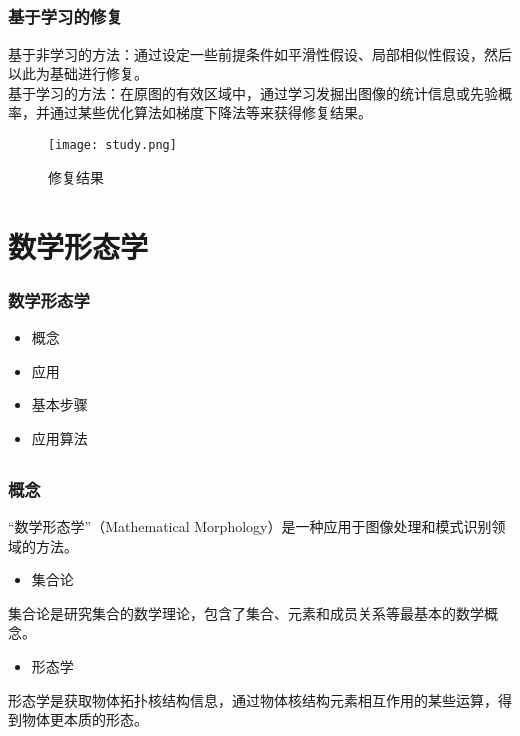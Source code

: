\documentclass[notheorems,mathserif,table,compress]{beamer}  %
\begin{document}
\subsection{}
\begin{frame}
   \frametitle{基于学习的修复}
  \hspace{0.3in} 基于非学习的方法：通过设定一些前提条件如平滑性假设、局部相似性假设，然后以此为基础进行修复。\\
   \hspace{0.3in}基于学习的方法：在原图的有效区域中，通过学习发掘出图像的统计信息或先验概率，并通过某些优化算法如梯度下降法等来获得修复结果。
   \begin{figure}
   \centering
   \texttt{[image: study.png]}
   \caption{修复结果}
   \end{figure}   
\end{frame}

\section{数学形态学}
\begin{frame}
   \frametitle{数学形态学}
   \begin{itemize}
   \item 概念
   \item 应用
   \item 基本步骤
   \item 应用算法
   \end{itemize}
\end{frame}

\subsection{}
\begin{frame}
   \frametitle{概念}
    \hspace{0.3in}“数学形态学”（Mathematical Morphology）是一种应用于图像处理和模式识别领域的方法。\\
   \begin{itemize}
   \item 集合论
   \end{itemize}
   \hspace{0.3in}集合论是研究集合的数学理论，包含了集合、元素和成员关系等最基本的数学概念。\\
   \begin{itemize}
   \item 形态学
   \end{itemize}
   \hspace{0.3in} 形态学是获取物体拓扑核结构信息，通过物体核结构元素相互作用的某些运算，得到物体更本质的形态。\\
\end{frame}
\end{document}
